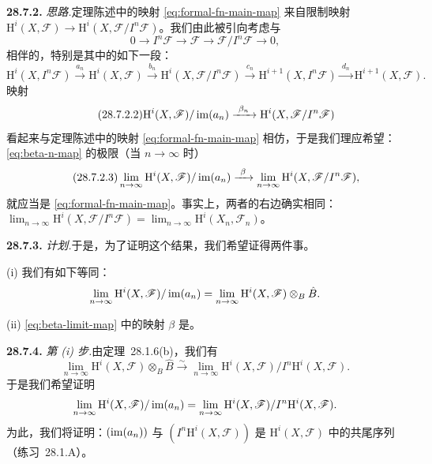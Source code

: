 \textbf{28.7.2.} \emph{思路.}\quad 定理陈述中的映射 \eqref{eq:formal-fn-main-map} 来自限制映射 $\mathrm{H}^i(X,\mathscr{F})\to\mathrm{H}^i(X,\mathscr{F}/I^n\mathscr{F})$。我们由此被引向考虑与
\[
0\longrightarrow I^n\mathscr{F}\longrightarrow\mathscr{F}\longrightarrow\mathscr{F}/I^n\mathscr{F}\longrightarrow 0,
\]
相伴的\trLongExactSequence，特别是其中的如下一段：
\begin{equation*}
\tag{28.7.2.1}\label{eq:long-exact-portion}
\mathrm{H}^i(X,I^n\mathscr{F})\xrightarrow{a_n}\mathrm{H}^i(X,\mathscr{F})\xrightarrow{b_n}\mathrm{H}^i(X,\mathscr{F}/I^n\mathscr{F})\xrightarrow{c_n}\mathrm{H}^{i+1}(X,I^n\mathscr{F})\xrightarrow{\ d_n\ }\mathrm{H}^{i+1}(X,\mathscr{F}).
\end{equation*}
映射
\begin{equation*}
\tag{28.7.2.2}\label{eq:beta-n-map}
\mathrm{H}^i(X,\mathscr{F})/\im(a_n)\xrightarrow{\ \beta_n\ }\mathrm{H}^i(X,\mathscr{F}/I^n\mathscr{F})
\end{equation*}
看起来与定理陈述中的映射 \eqref{eq:formal-fn-main-map} 相仿，于是我们理应希望：\eqref{eq:beta-n-map} 的极限（当 $n\to\infty$ 时）
\begin{equation*}
\tag{28.7.2.3}\label{eq:beta-limit-map}
\lim_{n\to\infty}\mathrm{H}^i(X,\mathscr{F})/\im(a_n)\xrightarrow{\ \beta\ }\lim_{n\to\infty}\mathrm{H}^i(X,\mathscr{F}/I^n\mathscr{F}),
\end{equation*}
就应当是 \eqref{eq:formal-fn-main-map}。事实上，两者的右边确实相同：$\lim_{n\to\infty}\mathrm{H}^i(X,\mathscr{F}/I^n\mathscr{F})=\lim_{n\to\infty}\mathrm{H}^i(X_n,\mathscr{F}_n)$。

\textbf{28.7.3.} \emph{计划.}\quad 于是，为了证明这个结果，我们希望证得两件事。

(i) 我们有如下等同：
\[
\lim_{n\to\infty}\mathrm{H}^i(X,\mathscr{F})/\operatorname{im}(a_n)=\lim_{n\to\infty}\mathrm{H}^i(X,\mathscr{F})\otimes_B\hat{B}.
\]

(ii) \eqref{eq:beta-limit-map} 中的映射 $\beta$ 是\trIsomorphism。

\textbf{28.7.4.} \emph{第 (i) 步.}\quad 由\mbox{定理~28.1.6}(b)，我们有\trIsomorphism
\[
\lim_{n\to\infty}\mathrm{H}^i(X,\mathscr{F})\otimes_B\hat{B}\stackrel{\sim}{\longrightarrow}\lim_{n\to\infty}\mathrm{H}^i(X,\mathscr{F})/I^n\mathrm{H}^i(X,\mathscr{F}).
\]
于是我们希望证明
\[
\lim_{n\to\infty}\mathrm{H}^i(X,\mathscr{F})/\operatorname{im}(a_n)=\lim_{n\to\infty}\mathrm{H}^i(X,\mathscr{F})/I^n\mathrm{H}^i(X,\mathscr{F}).
\]
为此，我们将证明：$(\operatorname{im}(a_n))$ 与 $(I^n\mathrm{H}^i(X,\mathscr{F}))$ 是 $\mathrm{H}^i(X,\mathscr{F})$ 中\trSubgroup{}的共尾序列（\mbox{练习~28.1.A}）。


